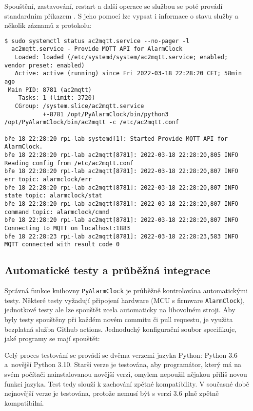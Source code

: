 Spouštění, zastavování, restart a další operace se službou se poté provádí
standardním příkazem . S jeho pomocí lze vypsat i informace
o stavu služby a několik záznamů z protokolu:
\begin{lstlisting}[style=terminal]
$ sudo systemctl status ac2mqtt.service --no-pager -l
  ac2mqtt.service - Provide MQTT API for AlarmClock
   Loaded: loaded (/etc/systemd/system/ac2mqtt.service; enabled; vendor preset: enabled)
   Active: active (running) since Fri 2022-03-18 22:28:20 CET; 58min ago
 Main PID: 8781 (ac2mqtt)
    Tasks: 1 (limit: 3720)
   CGroup: /system.slice/ac2mqtt.service
           +-8781 /opt/PyAlarmClock/bin/python3 /opt/PyAlarmClock/bin/ac2mqtt -c /etc/ac2mqtt.conf

bře 18 22:28:20 rpi-lab systemd[1]: Started Provide MQTT API for AlarmClock.
bře 18 22:28:20 rpi-lab ac2mqtt[8781]: 2022-03-18 22:28:20,805 INFO Reading config from /etc/ac2mqtt.conf
bře 18 22:28:20 rpi-lab ac2mqtt[8781]: 2022-03-18 22:28:20,807 INFO err topic: alarmclock/err
bře 18 22:28:20 rpi-lab ac2mqtt[8781]: 2022-03-18 22:28:20,807 INFO state topic: alarmclock/stat
bře 18 22:28:20 rpi-lab ac2mqtt[8781]: 2022-03-18 22:28:20,807 INFO command topic: alarmclock/cmnd
bře 18 22:28:20 rpi-lab ac2mqtt[8781]: 2022-03-18 22:28:20,807 INFO Connecting to MQTT on localhost:1883
bře 18 22:28:23 rpi-lab ac2mqtt[8781]: 2022-03-18 22:28:23,583 INFO MQTT connected with result code 0
\end{lstlisting}


\subsection{Automatické testy a průběžná integrace}
Správná funkce knihovny \texttt{PyAlarmClock} je průběžně kontrolována
automatickými testy. Některé testy vyžadují připojení hardware (MCU s firmware
\texttt{AlarmClock}), jednotkové testy ale lze spouštět zcela automaticky na
libovolném stroji.
Aby byly testy spouštěny při každém novém commitu či pull requestu, je využita
bezplatná služba Github actions. Jednoduchý konfigurační soubor
 specifikuje, jaké programy se mají
spouštět:

Celý proces testování se provádí se dvěma verzemi jazyka Python: Python 3.6
a~novější Python 3.10. Starší verze je testována, aby programátor, který má na
svém počítači nainstalovanou novější verzi, omylem nepoužil nějakou příliš
novou funkci jazyka. Test tedy slouží k zachování zpětné kompatibility.
V současné době nejnovější verze je testována, protože nemusí být s verzí 3.6
plně zpětně kompatibilní.

